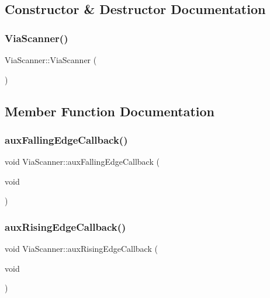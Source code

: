 \subsection{Constructor \& Destructor Documentation}
\mbox{\label{class_via_scanner_a4c6d8ee19c222188b16fec29494f14df}} 
\subsubsection{\texorpdfstring{Via\+Scanner()}{ViaScanner()}}
{\footnotesize\ttfamily Via\+Scanner\+::\+Via\+Scanner (\begin{DoxyParamCaption}{ }\end{DoxyParamCaption})\hspace{0.3cm}{\ttfamily [inline]}}



\subsection{Member Function Documentation}
\mbox{\label{class_via_scanner_ab790912e79b3a02e96e400f038cbe2fe}} 
\subsubsection{\texorpdfstring{aux\+Falling\+Edge\+Callback()}{auxFallingEdgeCallback()}}
{\footnotesize\ttfamily void Via\+Scanner\+::aux\+Falling\+Edge\+Callback (\begin{DoxyParamCaption}\item[{void}]{ }\end{DoxyParamCaption})}

\mbox{\label{class_via_scanner_abcc13461ed886eab18eb3dd2f55f3f40}} 
\subsubsection{\texorpdfstring{aux\+Rising\+Edge\+Callback()}{auxRisingEdgeCallback()}}
{\footnotesize\ttfamily void Via\+Scanner\+::aux\+Rising\+Edge\+Callback (\begin{DoxyParamCaption}\item[{void}]{ }\end{DoxyParamCaption})}

